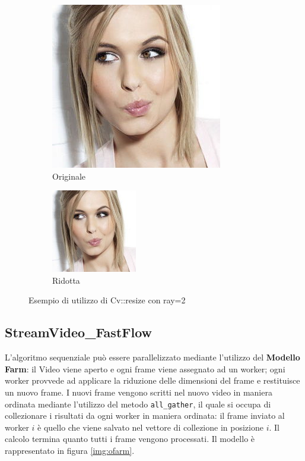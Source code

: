 \documentclass[12pt]{article}
\begin{document}
\begin{figure}[h]
\begin{subfigure}{.55\textwidth}
  \centering
  \includegraphics[scale=.42,keepaspectratio]{original.jpg}
  \caption{Originale}
  \label{fig:tisc}
\end{subfigure} 
\begin{subfigure}{.55\textwidth}
  \centering
  \includegraphics[scale=.42,keepaspectratio]{resize.jpg}
  \caption{Ridotta}
  \label{fig:ftsec}
\end{subfigure}
\caption{Esempio di utilizzo di Cv::resize con ray=2}
\label{img:evi}
\end{figure}




\subsection{StreamVideo\_FastFlow}
L'algoritmo sequenziale pu\`o essere parallelizzato mediante l'utilizzo del \textbf{Modello Farm}: il Video viene aperto e ogni frame viene assegnato ad un worker; ogni worker provvede ad applicare la riduzione delle dimensioni del frame e restituisce un nuovo frame. I nuovi frame vengono scritti nel nuovo video in maniera ordinata mediante l'utilizzo del metodo \texttt{all\_gather}, il quale si occupa di collezionare i risultati da ogni worker in maniera ordinata: il frame inviato al worker $i$ \`e quello che viene salvato nel vettore di collezione in posizione $i$. Il calcolo termina quanto tutti i frame vengono processati. Il modello \`e rappresentato in figura \ref{img:ofarm}.
\end{document}
